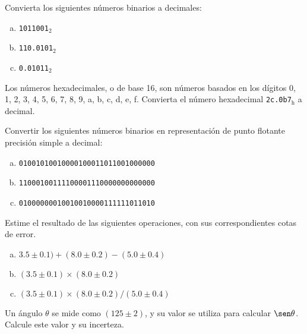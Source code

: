 \documentclass[11pt]{article}
\begin{document}
\begin{question} %
Convierta los siguientes números binarios a decimales:
\begin{enumerate}[a)]
    \item \texttt{1011001}$_2$
    \item \texttt{110.0101}$_2$
    \item \texttt{0.01011}$_2$
\end{enumerate}
\end{question}

\begin{question} %
    Los números hexadecimales, o de base 16, son números basados en los dígitos 0, 1, 2, 3, 4, 5, 6, 7, 8, 9, a, b, c, d, e, f. Convierta el número hexadecimal \texttt{2c.0b7}$_{\text{h}}$ a decimal.
\end{question}

\begin{question}
Convertir los siguientes números binarios en representación de punto flotante precisión simple a decimal: 
\begin{enumerate}[a)]
    \item \texttt{01001010010000100011011001000000} %
    \item \texttt{11000100111100001110000000000000} %
    \item \texttt{01000000010010010000111111011010} %
\end{enumerate}
\end{question}

\begin{question}
Estime el resultado de las siguientes operaciones, con sus correspondientes cotas de error.
\begin{enumerate}[a)]
    \item $3.5 \pm 0.1) + (8.0 \pm 0.2) - (5.0 \pm 0.4)$
    \item $(3.5 \pm 0.1) \times (8.0 \pm 0.2) $
    \item $(3.5 \pm 0.1) \times (8.0 \pm 0.2) / (5.0 \pm 0.4)$
\end{enumerate}
\end{question}

\begin{question} %
Un ángulo $\theta$ se mide como $(125 \pm 2)$\textdegree, y su valor se utiliza para calcular $\sen \theta$. Calcule este valor y su incerteza.
\end{question}
\end{document}

